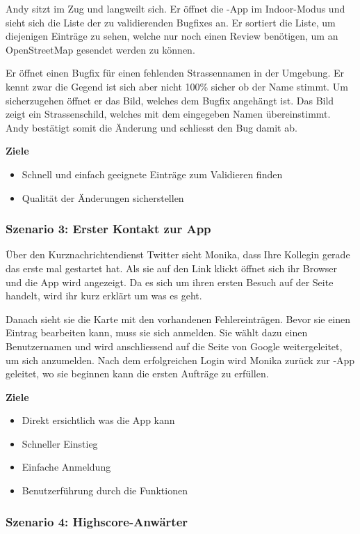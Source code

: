 Andy sitzt im Zug und langweilt sich. Er öffnet die \kort-App im Indoor-Modus und sieht sich die Liste der zu validierenden Bugfixes an. Er sortiert die Liste, um diejenigen Einträge zu sehen, welche nur noch einen Review benötigen, um an \gls{OpenStreetMap} gesendet werden zu können.

Er öffnet einen Bugfix für einen fehlenden Strassennamen in der Umgebung. Er kennt zwar die Gegend ist sich aber nicht 100\% sicher ob der Name stimmt. Um sicherzugehen öffnet er das Bild, welches dem Bugfix angehängt ist. Das Bild zeigt ein Strassenschild, welches mit dem eingegeben Namen übereinstimmt. Andy bestätigt somit die Änderung und schliesst den Bug damit ab.

\textbf{Ziele}
\begin{itemize}
\item Schnell und einfach geeignete Einträge zum Validieren finden
\item Qualität der Änderungen sicherstellen
\end{itemize}

\subsubsection{Szenario 3: Erster Kontakt zur App}

Über den Kurznachrichtendienst Twitter sieht Monika, dass Ihre Kollegin gerade das erste mal \kort gestartet hat.
Als sie auf den Link klickt öffnet sich ihr Browser und die App wird angezeigt.
Da es sich um ihren ersten Besuch auf der Seite handelt, wird ihr kurz erklärt um was es geht.

Danach sieht sie die Karte mit den vorhandenen Fehlereinträgen.
Bevor sie einen Eintrag bearbeiten kann, muss sie sich anmelden.
Sie wählt dazu einen Benutzernamen und wird anschliessend auf die Seite von Google weitergeleitet, um sich anzumelden.
Nach dem erfolgreichen Login wird Monika zurück zur \kort-App geleitet, wo sie beginnen kann die ersten Aufträge zu erfüllen.

\textbf{Ziele}
\begin{itemize}
\item Direkt ersichtlich was die App kann
\item Schneller Einstieg
\item Einfache Anmeldung
\item Benutzerführung durch die Funktionen
\end{itemize}

\subsubsection{Szenario 4: Highscore-Anwärter}

